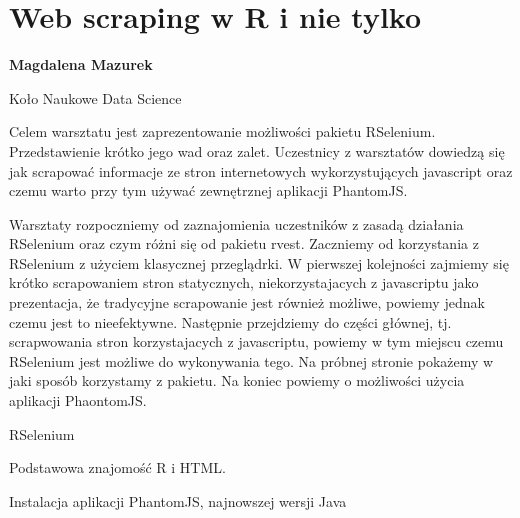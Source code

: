 \documentclass[\main/boa.tex]{subfiles}
\begin{document}
\section{Web scraping w R i nie tylko}

\begin{minipage}{0.915\textwidth}
\centering
{\bf {} Magdalena Mazurek}
\end{minipage}

\vskip 0.3cm

\begin{affiliations}
\begin{minipage}{0.915\textwidth}
\centering
\large Koło Naukowe Data Science  \\[2pt]
\end{minipage}
\end{affiliations}

\vskip 0.8cm

\opiswarsztatu Celem warsztatu jest zaprezentowanie możliwości pakietu RSelenium. Przedstawienie krótko jego wad oraz zalet. Uczestnicy z warsztatów dowiedzą się jak scrapować informacje ze stron internetowych wykorzystujących javascript oraz czemu warto przy tym używać zewnętrznej aplikacji PhantomJS.

\planwarsztatu
Warsztaty rozpoczniemy od zaznajomienia uczestników z zasadą działania RSelenium oraz czym różni się od pakietu rvest. Zaczniemy od korzystania z RSelenium z użyciem klasycznej przeglądrki. W pierwszej kolejności zajmiemy się krótko scrapowaniem stron statycznych, niekorzystajacych z javascriptu jako prezentacja, że tradycyjne scrapowanie jest również możliwe, powiemy jednak czemu jest to nieefektywne. Następnie przejdziemy do części głównej, tj. scrapwowania stron korzystajacych z javascriptu, powiemy w tym miejscu czemu RSelenium jest możliwe do wykonywania tego. Na próbnej stronie pokażemy w jaki sposób korzystamy z pakietu. Na koniec powiemy o możliwości użycia aplikacji PhaontomJS.	 

\pakiety RSelenium

\umiejetnosci Podstawowa znajomość R i HTML.

\wymagania Instalacja aplikacji PhantomJS, najnowszej wersji Java
\end{document}
